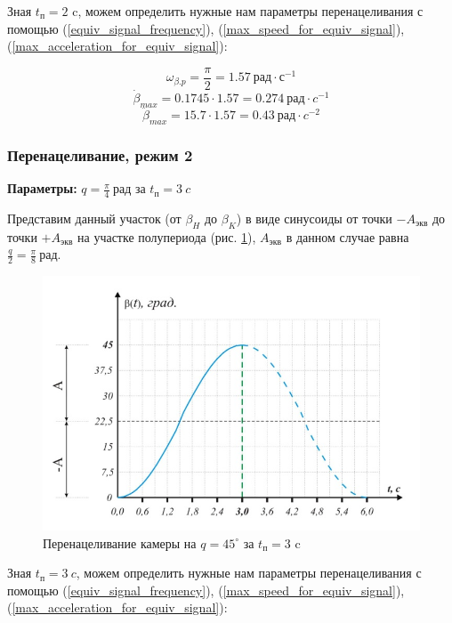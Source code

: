 Зная $t_{\textit{п} } = 2$ c, можем определить нужные нам параметры перенацеливания
с помощью (\ref{equiv_signal_frequency}),
(\ref{max_speed_for_equiv_signal}),
(\ref{max_acceleration_for_equiv_signal}):

$$
    \omega_{\beta.p} = \frac{\pi}{2} = 1.57 ~\textit{рад} \cdot \textit{с}^{-1}
$$
$$
    \dot{\beta}_{max} = 0.1745 \cdot 1.57 = 0.274 ~\textit{рад} \cdot \textit{c}^{-1}
$$
$$
    \ddot{\beta}_{max} = 15.7 \cdot 1.57 = 0.43 ~\textit{рад}  \cdot \textit{c}^{-2}
$$

\subsubsection{Перенацеливание, режим 2}

\textbf{Параметры:} $q = \frac{\pi}{4} ~\textit{рад}$ за $t_{\textit{п}} = 3 ~\textit{c}$

Представим данный участок (от $\beta_{H}$ до $\beta_{K}$) в виде синусоиды от
точки $-A_\textit{экв}$ до точки $+A_\textit{экв}$ на участке полупериода
(рис. \ref{retarget_45grad_3sec}), $A_\textit{экв}$ в данном случае равна
$\frac{q}{2} = \frac{\pi}{8} ~\textit{рад}$.

\begin{figure}[h!]
    \centering
    \includegraphics[keepaspectratio]{./src/pictures/retarget_equivalent_input_signals/45grad_3sec}
    \caption{Перенацеливание камеры на $q = 45^{\circ}$ за $t_\textit{п} = 3$ c}
    \label{retarget_45grad_3sec}
\end{figure}

Зная $t_{\textit{п} } = 3 ~\textit{c}$, можем определить нужные нам параметры перенацеливания
с помощью (\ref{equiv_signal_frequency}),
(\ref{max_speed_for_equiv_signal}),
(\ref{max_acceleration_for_equiv_signal}):


